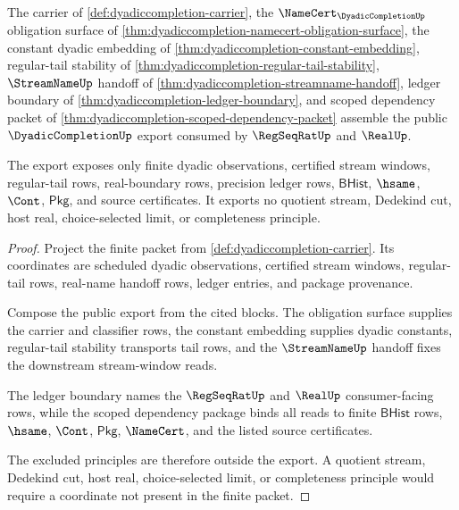 \begin{theorem}
\label{thm:dyadiccompletion-public-regseqrat-real-export}
The carrier of \autoref{def:dyadiccompletion-carrier}, the $\NameCert_{\DyadicCompletionUp}$ obligation surface of \autoref{thm:dyadiccompletion-namecert-obligation-surface}, the constant dyadic embedding of \autoref{thm:dyadiccompletion-constant-embedding}, regular-tail stability of \autoref{thm:dyadiccompletion-regular-tail-stability}, $\StreamNameUp$ handoff of \autoref{thm:dyadiccompletion-streamname-handoff}, ledger boundary of \autoref{thm:dyadiccompletion-ledger-boundary}, and scoped dependency packet of \autoref{thm:dyadiccompletion-scoped-dependency-packet} assemble the public $\DyadicCompletionUp$ export consumed by $\RegSeqRatUp$ and $\RealUp$.

The export exposes only finite dyadic observations, certified stream windows, regular-tail rows, real-boundary rows, precision ledger rows, $\mathsf{BHist}$, $\hsame$, $\Cont$, $\mathsf{Pkg}$, and source certificates. It exports no quotient stream, Dedekind cut, host real, choice-selected limit, or completeness principle.
\end{theorem}
\begin{proof}
Project the finite packet from \autoref{def:dyadiccompletion-carrier}. Its coordinates are scheduled dyadic observations, certified stream windows, regular-tail rows, real-name handoff rows, ledger entries, and package provenance.

Compose the public export from the cited blocks. The obligation surface supplies the carrier and classifier rows, the constant embedding supplies dyadic constants, regular-tail stability transports tail rows, and the $\StreamNameUp$ handoff fixes the downstream stream-window reads.

The ledger boundary names the $\RegSeqRatUp$ and $\RealUp$ consumer-facing rows, while the scoped dependency package binds all reads to finite $\mathsf{BHist}$ rows, $\hsame$, $\Cont$, $\mathsf{Pkg}$, $\NameCert$, and the listed source certificates.

The excluded principles are therefore outside the export. A quotient stream, Dedekind cut, host real, choice-selected limit, or completeness principle would require a coordinate not present in the finite packet.
\end{proof}

